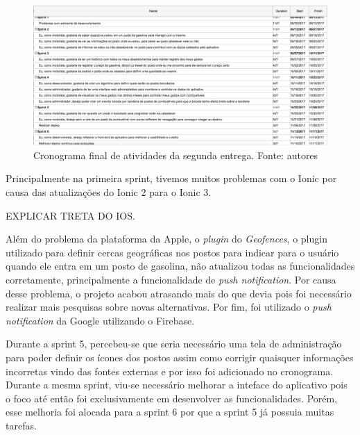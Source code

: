 \begin{figure}[H]
    \centering
    \includegraphics[scale=0.5]{figuras/cronograma_segunda_parte_2.png}
    \caption[Cronograma final de atividades da segunda entrega.]{Cronograma final de atividades da segunda entrega. Fonte: autores}
    \label{img:cronogramafinal}
\end{figure}

Principalmente na primeira sprint, tivemos muitos problemas com o Ionic por causa das atualizações do Ionic 2 para o Ionic 3.

EXPLICAR TRETA DO IOS.

Além do problema da plataforma da Apple, o \textit{plugin} do \textit{Geofences}, o plugin utilizado para definir cercas geográficas nos postos para indicar para o usuário quando ele entra em um posto de gasolina, não atualizou todas as funcionalidades corretamente, principalmente a funcionalidade de \textit{push notification}. Por causa desse problema, o projeto acabou atrasando mais do que devia pois foi necessário realizar mais pesquisas sobre novas alternativas. Por fim, foi utilizado o \textit{push notification} da Google utilizando o Firebase.

Durante a sprint 5, percebeu-se que seria necessário uma tela de administração para poder definir os ícones dos postos assim como corrigir quaisquer informações incorretas vindo das fontes externas e por isso foi adicionado no cronograma. Durante a mesma sprint, viu-se necessário melhorar a inteface do aplicativo pois o foco até então foi exclusivamente em desenvolver as funcionalidades. Porém, esse melhoria foi alocada para a sprint 6 por que a sprint 5 já possuia muitas tarefas.
